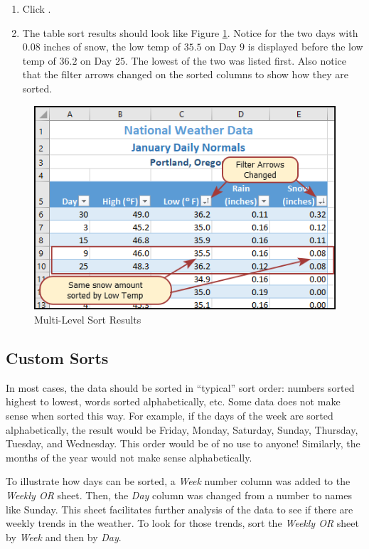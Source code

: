 \begin{enumbox}
\begin{enumerate}
		\item Click .
		\item The table sort results should look like Figure \ref{05:fig12}. Notice for the two days with $ 0.08 $ inches of snow, the low temp of $ 35.5 $ on Day $ 9 $ is displayed before the low temp of $ 36.2 $ on Day $ 25 $. The lowest of the two was listed first. Also notice that the filter arrows changed on the sorted columns to show how they are sorted.
	\end{enumerate}
\end{enumbox}

\begin{figure}[H]
	\centering
	\includegraphics[width=\maxwidth{.95\linewidth}]{gfx/ch05_fig12}
	\caption{Multi-Level Sort Results}
	\label{05:fig12}
\end{figure}

\subsection{Custom Sorts}

In most cases, the data should be sorted in ``typical'' sort order: numbers sorted highest to lowest, words sorted alphabetically, etc. Some data does not make sense when sorted this way. For example, if the days of the week are sorted alphabetically, the result would be Friday, Monday, Saturday, Sunday, Thursday, Tuesday, and Wednesday. This order would be of no use to anyone! Similarly, the months of the year would not make sense alphabetically.

To illustrate how days can be sorted, a \textit{Week} number column was added to the \textit{Weekly OR} sheet. Then, the \textit{Day} column was changed from a number to names like Sunday. This sheet facilitates further analysis of the data to see if there are weekly trends in the weather. To look for those trends, sort the \textit{Weekly OR} sheet by \textit{Week} and then by \textit{Day}.

